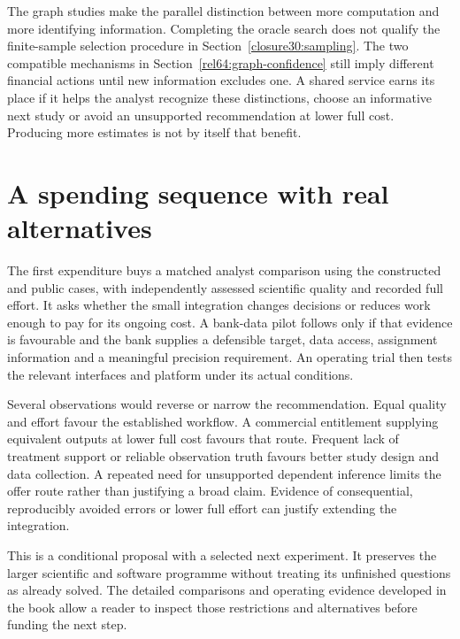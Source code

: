The graph studies make the parallel distinction between more computation and
more identifying information. Completing the oracle search does not qualify
the finite-sample selection procedure in Section~\ref{closure30:sampling}.
The two compatible mechanisms in Section~\ref{rel64:graph-confidence} still
imply different financial actions until new information excludes one. A shared
service earns its place if it helps the analyst recognize these distinctions,
choose an informative next study or avoid an unsupported recommendation at
lower full cost. Producing more estimates is not by itself that benefit.

\section{A spending sequence with real alternatives}
The first expenditure buys a matched analyst comparison using the
constructed and public cases, with independently assessed scientific
quality and recorded full effort. It asks whether the small integration
changes decisions or reduces work enough to pay for its ongoing cost.
A bank-data pilot follows only if that evidence is favourable and the
bank supplies a defensible target, data access, assignment information
and a meaningful precision requirement. An operating trial then tests
the relevant interfaces and platform under its actual conditions.

Several observations would reverse or narrow the recommendation. Equal
quality and effort favour the established workflow. A commercial
entitlement supplying equivalent outputs at lower full cost favours
that route. Frequent lack of treatment support or reliable observation
truth favours better study design and data collection. A repeated
need for unsupported dependent inference limits the offer route rather
than justifying a broad claim. Evidence of consequential, reproducibly
avoided errors or lower full effort can justify extending the integration.

This is a conditional proposal with a selected next experiment. It
preserves the larger scientific and software programme without treating
its unfinished questions as already solved. The detailed comparisons
and operating evidence developed in the book allow a reader to inspect those
restrictions and alternatives before funding the next step.
